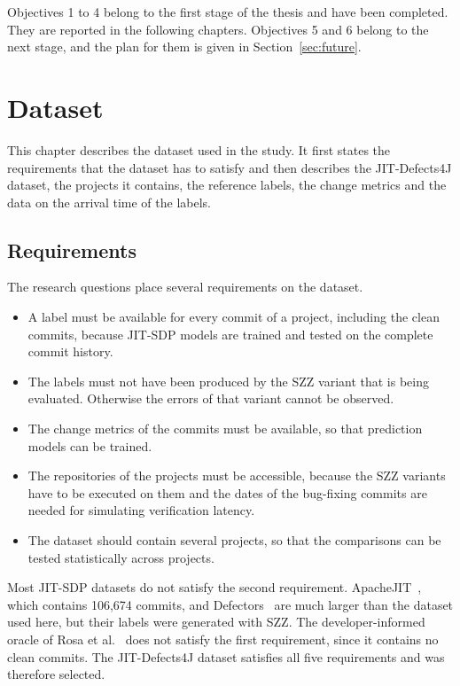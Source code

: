 \documentclass[12pt,a4paper,oneside]{report}
\begin{document}
Objectives 1 to 4 belong to the first stage of the thesis and have been
completed. They are reported in the following chapters. Objectives 5 and 6
belong to the next stage, and the plan for them is given in
Section~\ref{sec:future}.

\chapter{Dataset}\label{ch:data}

This chapter describes the dataset used in the study. It first states the
requirements that the dataset has to satisfy and then describes the
JIT-Defects4J dataset, the projects it contains, the reference labels, the
change metrics and the data on the arrival time of the labels.

\section{Requirements}

The research questions place several requirements on the dataset.

\begin{itemize}[leftmargin=*]
\item A label must be available for every commit of a project, including the
clean commits, because JIT-SDP models are trained and tested on the complete
commit history.
\item The labels must not have been produced by the SZZ variant that is being
evaluated. Otherwise the errors of that variant cannot be observed.
\item The change metrics of the commits must be available, so that prediction
models can be trained.
\item The repositories of the projects must be accessible, because the SZZ
variants have to be executed on them and the dates of the bug-fixing commits
are needed for simulating verification latency.
\item The dataset should contain several projects, so that the comparisons
can be tested statistically across projects.
\end{itemize}

Most JIT-SDP datasets do not satisfy the second requirement.
ApacheJIT~\cite{keshavarz2022apachejit}, which contains 106,674 commits, and
Defectors~\cite{mahbub2023defectors} are much larger than the dataset used
here, but their labels were generated with SZZ. The developer-informed oracle
of Rosa et al.~\cite{rosa2021oracle} does not satisfy the first requirement,
since it contains no clean commits. The JIT-Defects4J dataset satisfies all
five requirements and was therefore selected.
\end{document}
